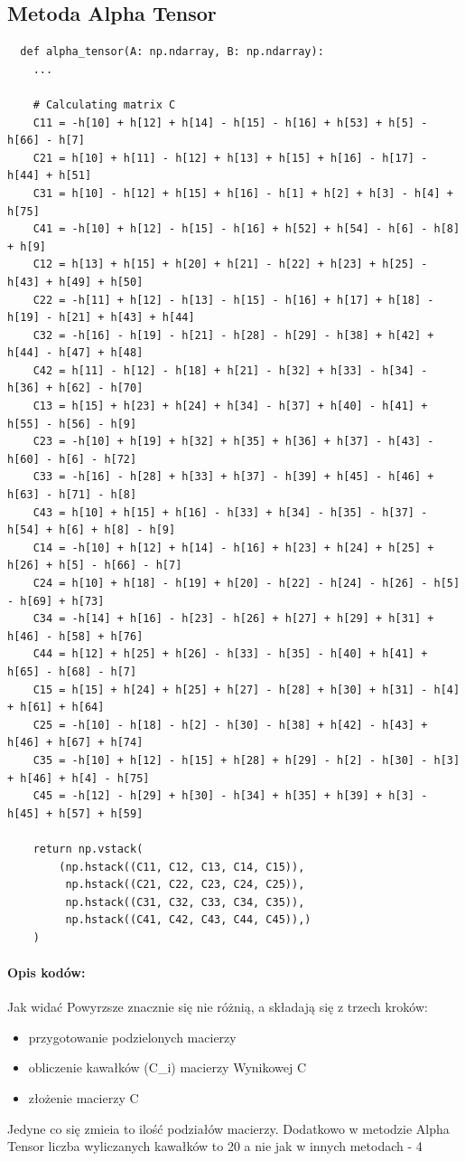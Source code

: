 \documentclass{article}
\begin{document}
\subsection{Metoda Alpha Tensor}
\begin{lstlisting}
  def alpha_tensor(A: np.ndarray, B: np.ndarray):
    ...

    # Calculating matrix C
    C11 = -h[10] + h[12] + h[14] - h[15] - h[16] + h[53] + h[5] - h[66] - h[7]
    C21 = h[10] + h[11] - h[12] + h[13] + h[15] + h[16] - h[17] - h[44] + h[51]
    C31 = h[10] - h[12] + h[15] + h[16] - h[1] + h[2] + h[3] - h[4] + h[75]
    C41 = -h[10] + h[12] - h[15] - h[16] + h[52] + h[54] - h[6] - h[8] + h[9]
    C12 = h[13] + h[15] + h[20] + h[21] - h[22] + h[23] + h[25] - h[43] + h[49] + h[50]
    C22 = -h[11] + h[12] - h[13] - h[15] - h[16] + h[17] + h[18] - h[19] - h[21] + h[43] + h[44]
    C32 = -h[16] - h[19] - h[21] - h[28] - h[29] - h[38] + h[42] + h[44] - h[47] + h[48]
    C42 = h[11] - h[12] - h[18] + h[21] - h[32] + h[33] - h[34] - h[36] + h[62] - h[70]
    C13 = h[15] + h[23] + h[24] + h[34] - h[37] + h[40] - h[41] + h[55] - h[56] - h[9]
    C23 = -h[10] + h[19] + h[32] + h[35] + h[36] + h[37] - h[43] - h[60] - h[6] - h[72]
    C33 = -h[16] - h[28] + h[33] + h[37] - h[39] + h[45] - h[46] + h[63] - h[71] - h[8]
    C43 = h[10] + h[15] + h[16] - h[33] + h[34] - h[35] - h[37] - h[54] + h[6] + h[8] - h[9]
    C14 = -h[10] + h[12] + h[14] - h[16] + h[23] + h[24] + h[25] + h[26] + h[5] - h[66] - h[7]
    C24 = h[10] + h[18] - h[19] + h[20] - h[22] - h[24] - h[26] - h[5] - h[69] + h[73]
    C34 = -h[14] + h[16] - h[23] - h[26] + h[27] + h[29] + h[31] + h[46] - h[58] + h[76]
    C44 = h[12] + h[25] + h[26] - h[33] - h[35] - h[40] + h[41] + h[65] - h[68] - h[7]
    C15 = h[15] + h[24] + h[25] + h[27] - h[28] + h[30] + h[31] - h[4] + h[61] + h[64]
    C25 = -h[10] - h[18] - h[2] - h[30] - h[38] + h[42] - h[43] + h[46] + h[67] + h[74]
    C35 = -h[10] + h[12] - h[15] + h[28] + h[29] - h[2] - h[30] - h[3] + h[46] + h[4] - h[75]
    C45 = -h[12] - h[29] + h[30] - h[34] + h[35] + h[39] + h[3] - h[45] + h[57] + h[59]

    return np.vstack(
        (np.hstack((C11, C12, C13, C14, C15)),
         np.hstack((C21, C22, C23, C24, C25)),
         np.hstack((C31, C32, C33, C34, C35)),
         np.hstack((C41, C42, C43, C44, C45)),)
    )
\end{lstlisting}
\paragraph*{Opis kodów:}
Jak widać Powyrzsze znacznie się nie różnią, a składają się z trzech kroków:
\begin{itemize}
  \item przygotowanie podzielonych macierzy
  \item obliczenie kawałków (C\_i) macierzy Wynikowej C
  \item złożenie macierzy C
\end{itemize}
Jedyne co się zmieia to ilość podziałów macierzy. Dodatkowo w metodzie Alpha Tensor liczba wyliczanych kawałków to 20 a nie jak w innych metodach - 4
\end{document}
